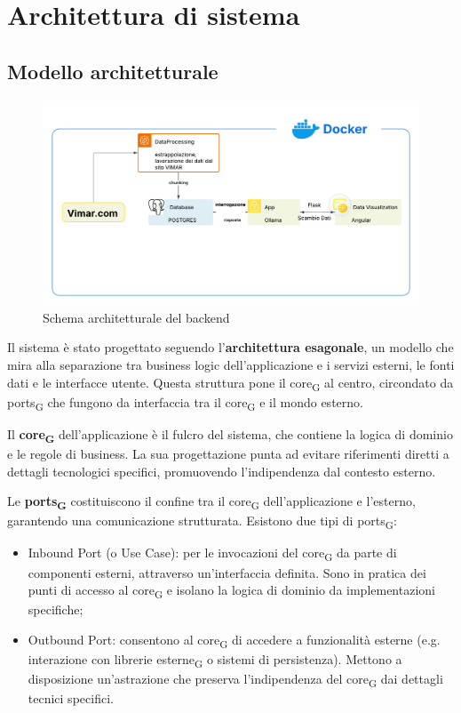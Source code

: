 \section{Architettura di sistema }
\subsection{Modello architetturale}
    \begin{figure}[H]
    \centering
    \includegraphics[width=\textwidth]{images/esagonale.png}
    \caption{Schema architetturale del backend}
    \label{fig:architettura}
\end{figure}
Il sistema è stato progettato seguendo l'\textbf{architettura esagonale}, un modello che mira alla separazione tra business logic dell'applicazione e i servizi esterni, le fonti dati e le interfacce utente. Questa struttura pone il core\textsubscript{G} al centro, circondato da ports\textsubscript{G} che fungono da interfaccia tra il core\textsubscript{G} e il mondo esterno.

Il \textbf{core\textsubscript{G}} dell'applicazione è il fulcro del sistema, che contiene la logica di dominio e le regole di business. La sua progettazione punta ad evitare riferimenti diretti a dettagli tecnologici specifici, promuovendo l'indipendenza dal contesto esterno.

Le \textbf{ports\textsubscript{G}} costituiscono il confine tra il core\textsubscript{G} dell'applicazione e l'esterno, garantendo una comunicazione strutturata. Esistono due tipi di ports\textsubscript{G}: 
\begin{itemize}
    \item Inbound Port (o Use Case): per le invocazioni del core\textsubscript{G} da parte di componenti esterni, attraverso un'interfaccia definita. Sono in pratica dei punti di accesso al core\textsubscript{G} e isolano la logica di dominio da implementazioni specifiche;
    \item Outbound Port: consentono al core\textsubscript{G} di accedere a funzionalità esterne (e.g. interazione con librerie esterne\textsubscript{G} o sistemi di persistenza). Mettono a disposizione un'astrazione che preserva l'indipendenza del core\textsubscript{G} dai dettagli tecnici specifici. 
\end{itemize}

